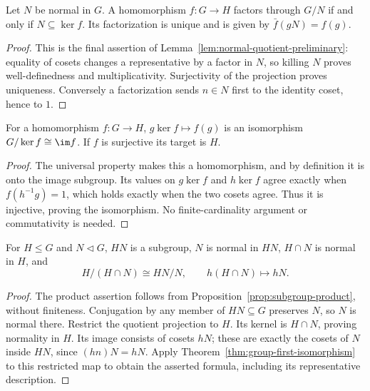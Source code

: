 \begin{theorem}\label{thm:quotient-universal}
Let $N$ be normal in $G$. A homomorphism $f:G\to H$ factors through $G/N$ if and only if $N\subseteq\ker f$. Its factorization is unique and is given by $\bar f(gN)=f(g)$.
\end{theorem}
\begin{proof}
This is the final assertion of Lemma~\ref{lem:normal-quotient-preliminary}: equality of cosets changes a representative by a factor in $N$, so killing $N$ proves well-definedness and multiplicativity. Surjectivity of the projection proves uniqueness. Conversely a factorization sends $n\in N$ first to the identity coset, hence to $1$.
\end{proof}


\begin{theorem}\label{thm:group-first-isomorphism}
For a homomorphism $f:G\to H$, $g\ker f\mapsto f(g)$ is an isomorphism $G/\ker f\cong\im f$. If $f$ is surjective its target is $H$.
\end{theorem}
\begin{proof}
The universal property makes this a homomorphism, and by definition it is onto the image subgroup. Its values on $g\ker f$ and $h\ker f$ agree exactly when $f(h^{-1}g)=1$, which holds exactly when the two cosets agree. Thus it is injective, proving the isomorphism. No finite-cardinality argument or commutativity is needed.
\end{proof}

\begin{theorem}\label{thm:group-second-isomorphism}
For $H\leq G$ and $N\mathrel{\triangleleft}G$, $HN$ is a subgroup, $N$ is normal in $HN$, $H\cap N$ is normal in $H$, and
\[
 H/(H\cap N)\cong HN/N,\qquad h(H\cap N)\longmapsto hN.
\]
\end{theorem}
\begin{proof}
The product assertion follows from Proposition~\ref{prop:subgroup-product}, without finiteness. Conjugation by any member of $HN\subseteq G$ preserves $N$, so $N$ is normal there. Restrict the quotient projection to $H$. Its kernel is $H\cap N$, proving normality in $H$. Its image consists of cosets $hN$; these are exactly the cosets of $N$ inside $HN$, since $(hn)N=hN$. Apply Theorem~\ref{thm:group-first-isomorphism} to this restricted map to obtain the asserted formula, including its representative description.
\end{proof}

